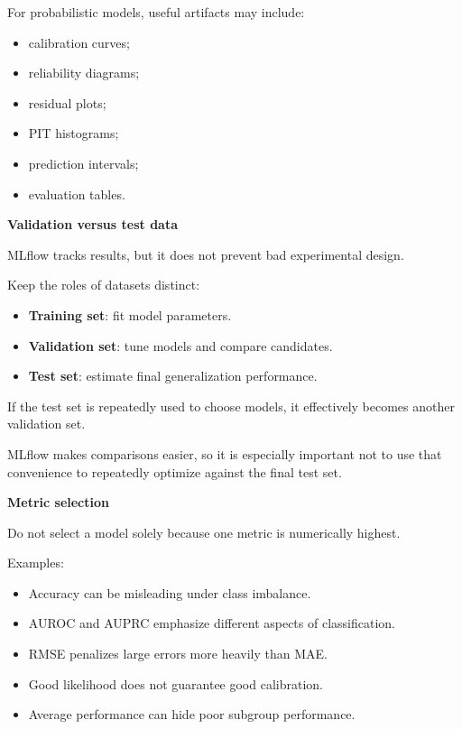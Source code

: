 \documentclass[11pt,letterpaper]{article}
\begin{document}
For probabilistic models, useful artifacts may include:

\begin{itemize}[leftmargin=*]
    \item calibration curves;
    \item reliability diagrams;
    \item residual plots;
    \item PIT histograms;
    \item prediction intervals;
    \item evaluation tables.
\end{itemize}

\textbf{Validation versus test data}

MLflow tracks results, but it does not prevent bad experimental design.

Keep the roles of datasets distinct:

\begin{itemize}[leftmargin=*]
    \item \textbf{Training set}: fit model parameters.
    \item \textbf{Validation set}: tune models and compare candidates.
    \item \textbf{Test set}: estimate final generalization performance.
\end{itemize}

If the test set is repeatedly used to choose models, it effectively becomes
another validation set.

MLflow makes comparisons easier, so it is especially important not to use
that convenience to repeatedly optimize against the final test set.

\textbf{Metric selection}

Do not select a model solely because one metric is numerically highest.

Examples:

\begin{itemize}[leftmargin=*]
    \item Accuracy can be misleading under class imbalance.
    \item AUROC and AUPRC emphasize different aspects of classification.
    \item RMSE penalizes large errors more heavily than MAE.
    \item Good likelihood does not guarantee good calibration.
    \item Average performance can hide poor subgroup performance.
\end{itemize}
\end{document}
